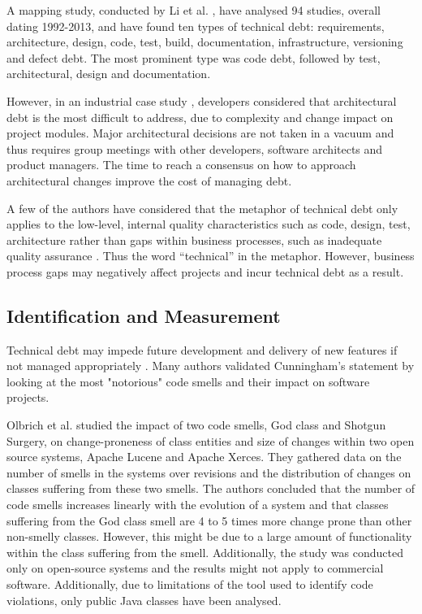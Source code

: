 \documentclass{mprop}
\begin{document}
A mapping study, conducted by Li et al. \cite{Li2015}, have analysed 94 studies,
overall dating 1992-2013, and have found ten types of technical debt:
requirements, architecture, design, code, test, build, documentation,
infrastructure, versioning and defect debt. The most prominent type was code
debt, followed by test, architectural, design and documentation.

However, in an industrial case study \cite{Codabux2013}, developers considered
that architectural debt is the most difficult to address, due to complexity and
change impact on project modules. Major architectural decisions are not taken in
a vacuum and thus requires group meetings with other developers, software
architects and product managers. The time to reach a consensus on how to
approach architectural changes improve the cost of managing debt.

A few of the authors have considered that the metaphor of technical debt only
applies to the low-level, internal quality characteristics such as code, design,
test, architecture rather than gaps within business processes, such as
inadequate quality assurance \cite{Theodoropoulos2011} \cite{Nugroho2011}. Thus
the word ``technical'' in the metaphor. However, business process gaps may
negatively affect projects and incur technical debt as a result.

\subsection{Identification and Measurement}


Technical debt may impede future development and delivery of new features if not
managed appropriately \cite{Cunningham1993}. Many authors validated Cunningham's
statement by looking at the most "notorious" code smells \cite{Fowler1999} and
their impact on software projects.

Olbrich et al. \cite{Olbrich2009} studied the impact of two code smells, God
class and Shotgun Surgery, on change-proneness of class entities and size of
changes within two open source systems, Apache Lucene and Apache Xerces. They
gathered data on the number of smells in the systems over revisions and the
distribution of changes on classes suffering from these two smells. The authors
concluded that the number of code smells increases linearly with the evolution
of a system and that classes suffering from the God class smell are 4 to 5 times
more change prone than other non-smelly classes. However, this might be due to a
large amount of functionality within the class suffering from the smell.
Additionally, the study was conducted only on open-source systems and the
results might not apply to commercial software. Additionally, due to limitations
of the tool used to identify code violations, only public Java classes have been
analysed.
\end{document}
